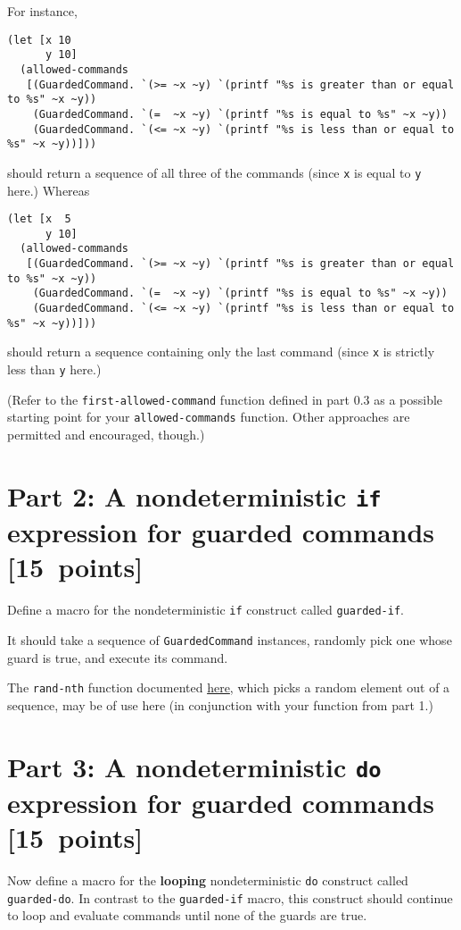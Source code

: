 \documentclass[11pt]{article}
\begin{document}
For instance,
\begin{verbatim}
(let [x 10
      y 10]
  (allowed-commands
   [(GuardedCommand. `(>= ~x ~y) `(printf "%s is greater than or equal to %s" ~x ~y))
    (GuardedCommand. `(=  ~x ~y) `(printf "%s is equal to %s" ~x ~y))
    (GuardedCommand. `(<= ~x ~y) `(printf "%s is less than or equal to %s" ~x ~y))]))
\end{verbatim}
should return a sequence of all three of the commands
(since \texttt{x} is equal to \texttt{y} here.)
Whereas
\begin{verbatim}
(let [x  5
      y 10]
  (allowed-commands
   [(GuardedCommand. `(>= ~x ~y) `(printf "%s is greater than or equal to %s" ~x ~y))
    (GuardedCommand. `(=  ~x ~y) `(printf "%s is equal to %s" ~x ~y))
    (GuardedCommand. `(<= ~x ~y) `(printf "%s is less than or equal to %s" ~x ~y))]))
\end{verbatim}
should return a sequence containing only the last command
(since \texttt{x} is strictly less than \texttt{y} here.)

(Refer to the \texttt{first-allowed-command} function defined in part 0.3
as a possible starting point for your \texttt{allowed-commands} function.
Other approaches are permitted and encouraged, though.)

\section*{Part 2: A nondeterministic \texttt{if} expression for guarded commands [15 points]}
\label{sec:orgd34fcda}
Define a macro for the nondeterministic \texttt{if} construct
called \texttt{guarded-if}.

It should take a sequence of \texttt{GuardedCommand} instances,
randomly pick one whose guard is true,
and execute its command.

The \texttt{rand-nth} function documented \href{https://clojuredocs.org/clojure.core/rand-nth}{here},
which picks a random element out of a sequence, may be of use here
(in conjunction with your function from part 1.)

\section*{Part 3: A nondeterministic \texttt{do} expression for guarded commands [15 points]}
\label{sec:org06b3ee2}
Now define a macro for the \textbf{looping} nondeterministic \texttt{do} construct
called \texttt{guarded-do}. In contrast to the \texttt{guarded-if} macro,
this construct should continue to loop and evaluate commands
until none of the guards are true.
\end{document}
